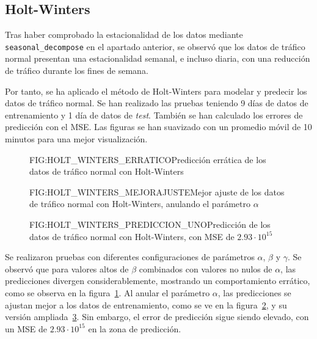 \subsection{Holt-Winters}

Tras haber comprobado la estacionalidad de los datos mediante \texttt{seasonal\_decompose} en el apartado anterior, se observó que los datos de tráfico normal presentan una estacionalidad semanal, e incluso diaria, con una reducción de tráfico durante los fines de semana.

Por tanto, se ha aplicado el método de Holt-Winters para modelar y predecir los datos de tráfico normal. Se han realizado las pruebas teniendo 9 días de datos de entrenamiento y 1 día de datos de \textit{test}. También se han calculado los errores de predicción con el \ac{MSE}. Las figuras se han suavizado con un promedio móvil de 10 minutos para una mejor visualización.

\begin{figure}[Predicción errática de los datos de tráfico normal con Holt-Winters]{FIG:HOLT_WINTERS_ERRATICO}{Predicción errática de los datos de tráfico normal con Holt-Winters}
    \label{FIG:HOLT_WINTERS_ERRATICO}
\end{figure}

\begin{figure}[Mejor ajuste de los datos de tráfico normal con Holt-Winters, anulando el parámetro $\alpha$]{FIG:HOLT_WINTERS_MEJORAJUSTE}{Mejor ajuste de los datos de tráfico normal con Holt-Winters, anulando el parámetro $\alpha$}
    \label{FIG:HOLT_WINTERS_MEJORAJUSTE}
\end{figure}

\begin{figure}[Predicción de los datos de tráfico normal con Holt-Winters, con MSE de $2.93\cdot 10^{15}$]{FIG:HOLT_WINTERS_PREDICCION_UNO}{Predicción de los datos de tráfico normal con Holt-Winters, con MSE de $2.93\cdot 10^{15}$}
    \label{FIG:HOLT_WINTERS_PREDICCION_UNO}
\end{figure}

Se realizaron pruebas con diferentes configuraciones de parámetros $\alpha$, $\beta$ y $\gamma$. Se observó que para valores altos de $\beta$ combinados con valores no nulos de $\alpha$, las predicciones divergen considerablemente, mostrando un comportamiento errático, como se observa en la figura~\ref{FIG:HOLT_WINTERS_ERRATICO}. Al anular el parámetro $\alpha$, las predicciones se ajustan mejor a los datos de entrenamiento, como se ve en la figura~\ref{FIG:HOLT_WINTERS_MEJORAJUSTE}, y su versión ampliada~\ref{FIG:HOLT_WINTERS_PREDICCION_UNO}. Sin embargo, el error de predicción sigue siendo elevado, con un \ac{MSE} de $2.93\cdot 10^{15}$ en la zona de predicción.

